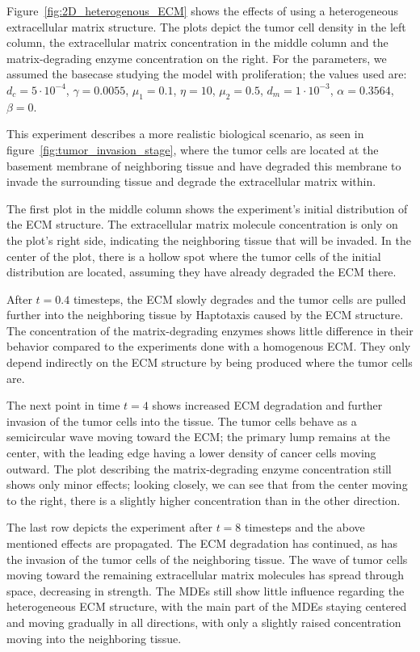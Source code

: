 Figure~\ref{fig:2D_heterogenous_ECM} shows the effects of using a heterogeneous extracellular matrix structure. The plots depict the tumor cell density in the left column, the extracellular matrix concentration in the middle column and the matrix-degrading enzyme concentration on the right. For the parameters, we assumed the basecase studying the model with proliferation; the values used are: $d_c=5\cdot 10^{-4}$, $\gamma=0.0055$, $\mu_1 = 0.1$, $\eta=10$, $\mu_2=0.5$, $d_m = 1\cdot 10^{-3}$, $\alpha = 0.3564$, $\beta = 0$.

This experiment describes a more realistic biological scenario, as seen in figure~\ref{fig:tumor_invasion_stage}, where the tumor cells are located at the basement membrane of neighboring tissue and have degraded this membrane to invade the surrounding tissue and degrade the extracellular matrix within.

The first plot in the middle column shows the experiment's initial distribution of the ECM structure. The extracellular matrix molecule concentration is only on the plot's right side, indicating the neighboring tissue that will be invaded. In the center of the plot, there is a hollow spot where the tumor cells of the initial distribution are located, assuming they have already degraded the ECM there.

After $t=0.4$ timesteps, the ECM slowly degrades and the tumor cells are pulled further into the neighboring tissue by Haptotaxis caused by the ECM structure. The concentration of the matrix-degrading enzymes shows little difference in their behavior compared to the experiments done with a homogenous ECM. They only depend indirectly on the ECM structure by being produced where the tumor cells are. 

The next point in time $t=4$ shows increased ECM degradation and further invasion of the tumor cells into the tissue. The tumor cells behave as a semicircular wave moving toward the ECM; the primary lump remains at the center, with the leading edge having a lower density of cancer cells moving outward. The plot describing the matrix-degrading enzyme concentration still shows only minor effects; looking closely, we can see that from the center moving to the right, there is a slightly higher concentration than in the other direction.

The last row depicts the experiment after $t=8$ timesteps and the above mentioned effects are propagated. The ECM degradation has continued, as has the invasion of the tumor cells of the neighboring tissue. The wave of tumor cells moving toward the remaining extracellular matrix molecules has spread through space, decreasing in strength. The MDEs still show little influence regarding the heterogeneous ECM structure, with the main part of the MDEs staying centered and moving gradually in all directions, with only a slightly raised concentration moving into the neighboring tissue.
 
